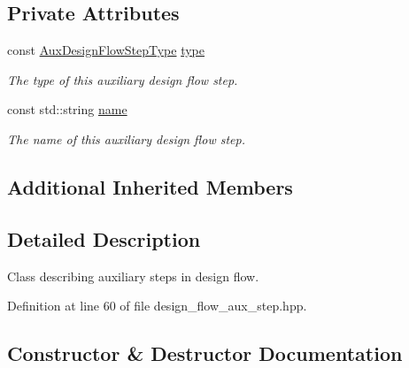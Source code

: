 \subsection*{Private Attributes}
\begin{DoxyCompactItemize}
\item 
const \hyperlink{design__flow__aux__step_8hpp_a11050839fc7a6c59f7ec7eb2d1f1568b}{Aux\+Design\+Flow\+Step\+Type} \hyperlink{classAuxDesignFlowStep_abd729d912bc25066e2508f244b6eed8d}{type}
\begin{DoxyCompactList}\small\item\em The type of this auxiliary design flow step. \end{DoxyCompactList}\item 
const std\+::string \hyperlink{classAuxDesignFlowStep_af8d85f43fd8f5fad0e80d45dcb43105c}{name}
\begin{DoxyCompactList}\small\item\em The name of this auxiliary design flow step. \end{DoxyCompactList}\end{DoxyCompactItemize}
\subsection*{Additional Inherited Members}


\subsection{Detailed Description}
Class describing auxiliary steps in design flow. 

Definition at line 60 of file design\+\_\+flow\+\_\+aux\+\_\+step.\+hpp.



\subsection{Constructor \& Destructor Documentation}
\mbox{\label{classAuxDesignFlowStep_a9a2a680f317e811409dc108a209f98c9}} 
